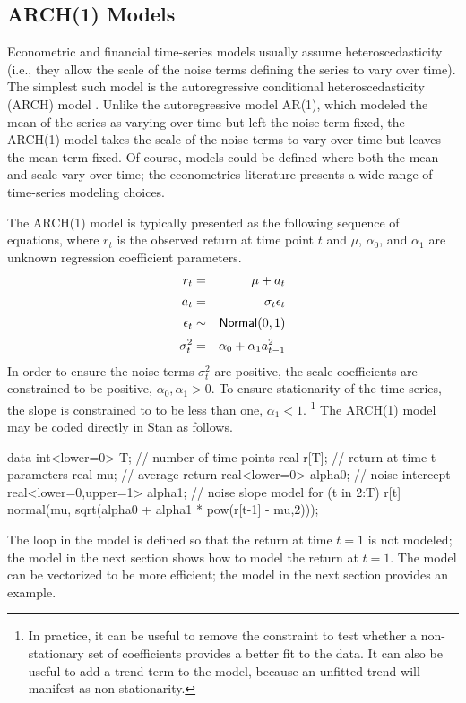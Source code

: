 \subsection{ARCH(1) Models}

Econometric and financial time-series models usually assume
heteroscedasticity (i.e., they allow the scale of the noise terms
defining the series to vary over time).
The simplest such model is the autoregressive conditional
heteroscedasticity (ARCH) model \citep{Engle:1982}.  Unlike the
autoregressive model AR(1), which modeled the mean of the series as
varying over time but left the noise term fixed, the ARCH(1) model
takes the scale of the noise terms to vary over time but leaves the
mean term fixed.  Of course, models could be defined where both the
mean and scale vary over time; the econometrics literature presents a
wide range of time-series modeling choices.

The ARCH(1) model is typically presented as the following sequence of
equations, where $r_t$ is the observed return at time point $t$
and $\mu$, $\alpha_0$, and $\alpha_1$ are unknown regression coefficient parameters.
%
\begin{eqnarray*}
r_t & = & \mu + a_t 
\\[2pt]
a_t & = & \sigma_t \epsilon_t
\\[2pt]
\epsilon_t & \sim & \distro{Normal}(0,1)
\\[2pt]
\sigma^2_t & = & \alpha_0 + \alpha_1 a_{t-1}^2
\end{eqnarray*}
%
In order to ensure the noise terms $\sigma^2_t$ are positive, the
scale coefficients are constrained to be positive, $\alpha_0, \alpha_1
> 0$.  To ensure stationarity of the time series, the slope is 
constrained to to be less than one, $\alpha_1 < 1$.%
%
\footnote{In practice, it can be useful to remove the constraint to
  test whether a non-stationary set of coefficients provides a better
  fit to the data.  It can also be useful to add a trend term to the
  model, because an unfitted trend will manifest as non-stationarity.}
%
The ARCH(1) model may be coded directly in Stan as follows.
%
\begin{stancode}
data {
  int<lower=0> T;   // number of time points
  real r[T];        // return at time t
}
parameters {
  real mu;                       // average return
  real<lower=0> alpha0;          // noise intercept
  real<lower=0,upper=1> alpha1;  // noise slope
}
model {
  for (t in 2:T)
    r[t] ~ normal(mu, sqrt(alpha0 + alpha1 * pow(r[t-1] - mu,2)));
}
\end{stancode}
%
The loop in the model is defined so that the return at time $t=1$ is
not modeled; the model in the next section shows how to model the
return at $t=1$.  The model can be vectorized to be more efficient;
the model in the next section provides an example.

